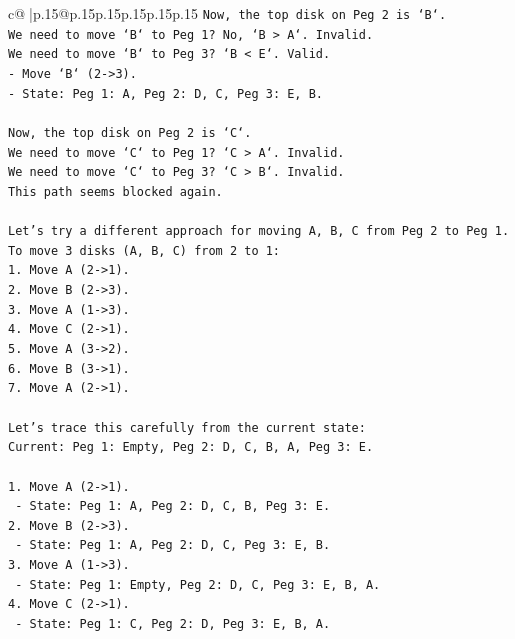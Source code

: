 \documentclass{article}
\begin{document}
{\begin{supertabular}{c@{$\;$}|p{.15\linewidth}@{}p{.15\linewidth}p{.15\linewidth}p{.15\linewidth}p{.15\linewidth}p{.15\linewidth}}
{{{\texttt{Now, the top disk on Peg 2 is `B`.} \\
\texttt{We need to move `B` to Peg 1? No, `B > A`. Invalid.} \\
\texttt{We need to move `B` to Peg 3? `B < E`. Valid.} \\
\texttt{{-} Move `B` (2{-}>3).} \\
\texttt{{-} State: Peg 1: A, Peg 2: D, C, Peg 3: E, B.} \\
\\ 
\texttt{Now, the top disk on Peg 2 is `C`.} \\
\texttt{We need to move `C` to Peg 1? `C > A`. Invalid.} \\
\texttt{We need to move `C` to Peg 3? `C > B`. Invalid.} \\
\texttt{This path seems blocked again.} \\
\\ 
\texttt{Let's try a different approach for moving A, B, C from Peg 2 to Peg 1.} \\
\texttt{To move 3 disks (A, B, C) from 2 to 1:} \\
\texttt{1. Move A (2{-}>1).} \\
\texttt{2. Move B (2{-}>3).} \\
\texttt{3. Move A (1{-}>3).} \\
\texttt{4. Move C (2{-}>1).} \\
\texttt{5. Move A (3{-}>2).} \\
\texttt{6. Move B (3{-}>1).} \\
\texttt{7. Move A (2{-}>1).} \\
\\ 
\texttt{Let's trace this carefully from the current state:} \\
\texttt{Current: Peg 1: Empty, Peg 2: D, C, B, A, Peg 3: E.} \\
\\ 
\texttt{1. Move A (2{-}>1).} \\
\texttt{   {-} State: Peg 1: A, Peg 2: D, C, B, Peg 3: E.} \\
\texttt{2. Move B (2{-}>3).} \\
\texttt{   {-} State: Peg 1: A, Peg 2: D, C, Peg 3: E, B.} \\
\texttt{3. Move A (1{-}>3).} \\
\texttt{   {-} State: Peg 1: Empty, Peg 2: D, C, Peg 3: E, B, A.} \\
\texttt{4. Move C (2{-}>1).} \\
\texttt{   {-} State: Peg 1: C, Peg 2: D, Peg 3: E, B, A.} \\
}}}
\end{supertabular}}
\end{document}
